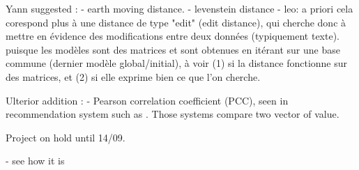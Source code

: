 Yann suggested : 
- earth moving distance. 
- levenstein distance
  - leo: a priori cela corespond plus à une distance de type "edit" (edit distance), qui cherche donc à mettre en évidence des modifications entre deux données (typiquement texte). puisque les modèles sont des matrices et sont obtenues en itérant sur une base commune (dernier modèle global/initial), à voir (1) si la distance fonctionne sur des matrices, et (2) si elle exprime bien ce que l'on cherche.

Ulterior addition : 
- Pearson correlation coefficient (PCC), seen in recommendation system such as \cite{afify_enhanced_2017}. Those systems compare two vector of value.

Project on hold until 14/09.

- see how it is
  